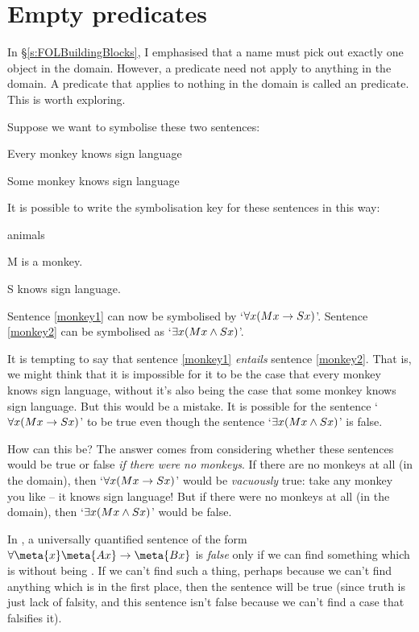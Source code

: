 \section{Empty predicates}
In §\ref{s:FOLBuildingBlocks}, I emphasised that a name must pick out exactly one object in the domain. However, a predicate need not apply to anything in the domain. A predicate that applies to nothing in the domain is called an  predicate. This is worth exploring.

Suppose we want to symbolise these two sentences:
	\begin{earg}
		\item[\ex{monkey1}] Every monkey knows sign language
		\item[\ex{monkey2}] Some monkey knows sign language
	\end{earg}
It is possible to write the symbolisation key for these sentences in this way:
	\begin{ekey}
		\item[\text{domain}] animals
		\item[M\meta{x}]  is a monkey.
		\item[S\meta{x}]  knows sign language.
	\end{ekey}
Sentence \ref{monkey1} can now be symbolised by `$\forall x(Mx \rightarrow Sx)$'. Sentence \ref{monkey2} can be symbolised as `$\exists x(Mx \wedge Sx)$'.

It is tempting to say that sentence \ref{monkey1} \emph{entails} sentence \ref{monkey2}. That is, we might think that it is impossible for it to be the case that every monkey knows sign language, without it's also being the case that some monkey knows sign language.  But this would be a mistake. It is possible for the sentence `$\forall x(Mx \rightarrow Sx)$' to be true even though the sentence `$\exists x(Mx \wedge Sx)$' is false.

How can this be? The answer comes from considering whether these sentences would be true or false \emph{if there were no monkeys}. If there are no monkeys at all (in the domain), then `$\forall x(Mx \rightarrow Sx)$' would be \emph{vacuously} true: take any monkey you like – it knows sign language! But if there were no monkeys at all (in the domain), then `$\exists x(Mx \wedge Sx)$' would be false.

In \FOL, a universally quantified sentence of the form $\forall \meta{x} \meta{Ax} \eif \meta{Bx}$ is \emph{false} only if we can find something which is  without being . If we can't find such a thing, perhaps because we can't find anything which is  in the first place, then the sentence will be true (since truth is just lack of falsity, and this sentence isn't false because we can't find a case that falsifies it). 

